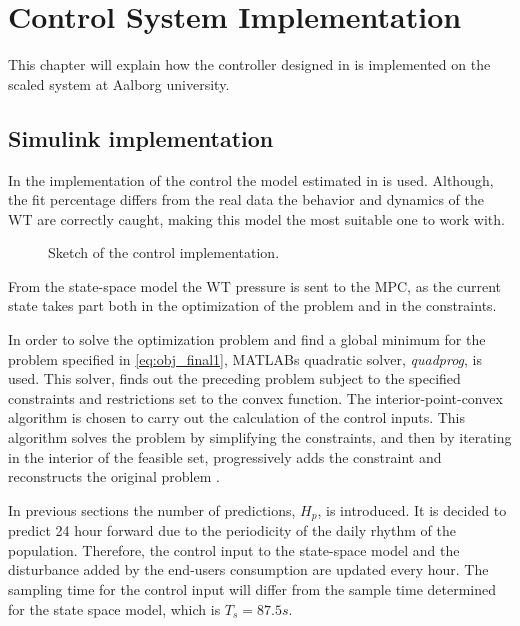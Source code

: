 \chapter{Control System Implementation}
\label{implementation_of_controller}

This chapter will explain how the controller designed in  is implemented on the scaled system at Aalborg university.  

\section{Simulink implementation}
\label{simulink_intro}
In the implementation of the control the model estimated in  is used. Although, the fit percentage differs from the real data the behavior and dynamics of the WT are correctly caught, making this model the most suitable one to work with. 

\begin{figure}[H]
\centering
 
\caption{Sketch of the control implementation.}
\label{fig:control_sketch}
\end{figure}

From the state-space model the WT pressure is sent to the MPC, as the current state takes part both in the optimization of the problem and in the constraints.

In order to solve the optimization problem and find a global minimum for the problem specified in \eqref{eq:obj_final1},  MATLABs quadratic solver, \textit{quadprog}, is used. This solver, finds out the preceding problem subject to the specified constraints and restrictions set to the convex function. The interior-point-convex algorithm is chosen to carry out the calculation of the control inputs. This algorithm solves the problem by simplifying the constraints, and then by iterating in the interior of the feasible set, progressively adds the constraint and reconstructs the original problem \cite{Convex_optimization}. 



In previous sections the number of predictions, $H_p$, is introduced. It is decided to predict 24 hour forward due to the periodicity of the daily rhythm of the population. Therefore, the control input to the state-space model and the disturbance added by the end-users consumption are updated every hour. The sampling time for the control input will differ from the sample time determined for the state space model, which is $T_s = 87.5s$. 

